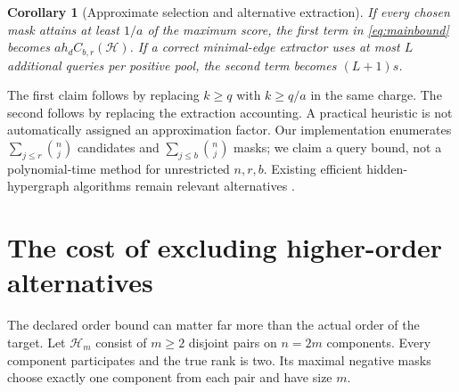 \documentclass[10pt]{article}
\newtheorem{corollary}[theorem]{Corollary}
\theoremstyle{definition}\newtheorem{definition}[theorem]{Definition}
\newcommand{\HH}{\mathcal H}
\begin{document}
\begin{corollary}[Approximate selection and alternative extraction]
If every chosen mask attains at least $1/a$ of the maximum score, the first term in
\eqref{eq:mainbound} becomes $a h_d C_{b,r}(\HH)$. If a correct minimal-edge extractor
uses at most $L$ additional queries per positive pool, the second term becomes
$(L+1)s$.
\end{corollary}
The first claim follows by replacing $k\ge q$ with $k\ge q/a$ in the same charge.
The second follows by replacing the extraction accounting. A practical heuristic
is not automatically assigned an approximation factor. Our implementation enumerates
$\sum_{j\le r}\binom nj$ candidates and $\sum_{j\le b}\binom nj$ masks; we claim a query
bound, not a polynomial-time method for unrestricted $n,r,b$. Existing efficient
hidden-hypergraph algorithms remain relevant alternatives \citep{angluin2006,abasi2014,chen2026}.

\section{The cost of excluding higher-order alternatives}
The declared order bound can matter far more than the actual order of the target.
Let $\HH_m$ consist of $m\ge2$ disjoint pairs on $n=2m$ components. Every component
participates and the true rank is two. Its maximal negative masks choose exactly
one component from each pair and have size $m$.
\end{document}
